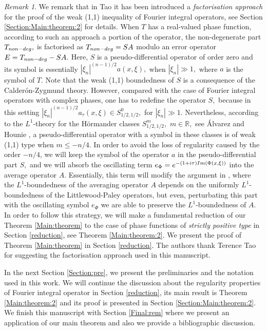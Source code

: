 \documentclass[12pt, reqno]{amsart}
\theoremstyle{definition}
\theoremstyle{remark}
\newtheorem{remark}[theorem]{Remark}
\numberwithin{equation}{section}
\begin{document}
\begin{remark}
We remark that in Tao \cite{Tao} it has been introduced a {\it factorisation approach} for the proof of the weak (1,1) inequality of Fourier integral operators, see Section \ref{Section:Main:theorem:2} for details. When $T$ has a real-valued phase function, according to such an approach a portion of the operator, the non-degenerate part $T_{\textnormal{non-deg}},$ is factorised as $T_{\textnormal{non-deg}}=SA$ modulo an error operator $E=T_{\textnormal{non-deg}}-SA.$ Here, $S$ is a pseudo-differential operator of order zero and its symbol is essentially $|\xi_n|^{(n-1)/2}a(x,\xi),$ when $|\xi_n|\gg 1,$ where $a$ is the symbol of $T.$ Note that the weak (1,1) boundedness of $S$ is a consequence of the Calder\'on-Zygmund theory.
 However, compared with the case of Fourier integral operators with complex phases, one has to redefine the operator $S,$ because in this setting  $|\xi_n|^{(n-1)/2}a_\tau(x,\xi)\in S^{0}_{1/2,1/2},$ for $|\xi_n|\gg 1.$ Nevertheless, according to the $L^1$-theory for the H\"ormander classes $S^{m}_{1/2,1/2},$ $m\in \mathbb{R},$ see \'Alvarez and Hounie \cite{Hounie}, a pseudo-differential operator with a symbol in these classes is of weak (1,1) type when $m\leq -n/4.$ In order to avoid the loss of regularity caused by the order $-n/4$, we will keep the symbol of the operator $a$ in the pseudo-differential part $S,$ and we will absorb the oscillating term $e_{\Phi}=e^{-(1+i\tau)\textnormal{Im}(\Phi(x,\xi) )}$ into the average operator $A. $ Essentially, this term will modify the argument in \cite{Tao}, where the $L^1$-boundedness of the averaging operator $A$ depends on the uniformly $L^1$-boundedness of the Littlewood-Paley operators, but even, perturbating this part with the oscillating symbol $e_{\Phi}$ we are able to preserve the $L^1$-boundedness of $A.$ In order to follow this strategy, we will make a fundamental reduction of our Theorem \ref{Main:theorem} to the case of phase functions of {\it strictly positive type}  in Section \ref{reduction}, see Theorem \ref{Main:theorem:2}.  We present the proof of Theorem \ref{Main:theorem} in Section \ref{reduction}.  The authors thank Terence Tao for suggesting the factorisation approach used in this manuscript.
\end{remark}
In the next Section \ref{Section:pre}, we present the preliminaries and the notation used in this work. We will continue the discussion about the regularity properties of Fourier integral operator in Section \ref{reduction}, its main result is Theorem \ref{Main:theorem:2} and its proof is presented in Section \ref{Section:Main:theorem:2}. We finish this manuscript with Section \ref{Final:rem} where we present an application of our main theorem and also we provide a bibliographic discussion.
\end{document}
